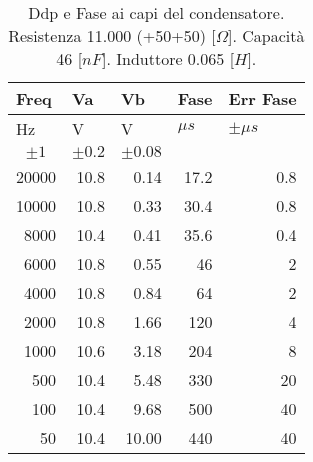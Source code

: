 \begin{table}[H]
\begin{center}
\begin{tabular}{|r|r|r|r|r|}
\hline
\multicolumn{1}{|l|}{Freq} & \multicolumn{1}{l|}{Va} & \multicolumn{1}{l|}{Vb} & \multicolumn{1}{l|}{Fase } & \multicolumn{1}{l|}{Err Fase} \\ \hline
\multicolumn{1}{|l|}{Hz} & \multicolumn{1}{l|}{V} & \multicolumn{1}{l|}{V} & \multicolumn{1}{l|}{$\mu s$} & \multicolumn{1}{l|}{$\pm \mu s$} \\ \hline
\multicolumn{1}{|c|}{$\pm 1$} & \multicolumn{1}{c|}{$\pm 0.2$} & \multicolumn{1}{c|}{$\pm 0.08$} & \multicolumn{1}{l|}{} & \multicolumn{1}{l|}{} \\ \hline
20000 & 10.8 & 0.14 & 17.2 & 0.8 \\ \hline
10000 & 10.8 & 0.33 & 30.4 & 0.8 \\ \hline
8000 & 10.4 & 0.41 & 35.6 & 0.4 \\ \hline
6000 & 10.8 & 0.55 & 46 & 2 \\ \hline
4000 & 10.8 & 0.84 & 64 & 2 \\ \hline
2000 & 10.8 & 1.66 & 120 & 4 \\ \hline
1000 & 10.6 & 3.18 & 204 & 8 \\ \hline
500 & 10.4 & 5.48 & 330 & 20 \\ \hline
100 & 10.4 & 9.68 & 500 & 40 \\ \hline
50 & 10.4 & 10.00 & 440 & 40 \\ \hline
\end{tabular}
\end{center}
\caption{Ddp e Fase ai capi del condensatore.
Resistenza 11.000 (+50+50)  [$\Omega$].
Capacità  46    [$nF$].
Induttore 0.065 [$H$].}
\label{tab:C2_P2_cond}
\end{table}
